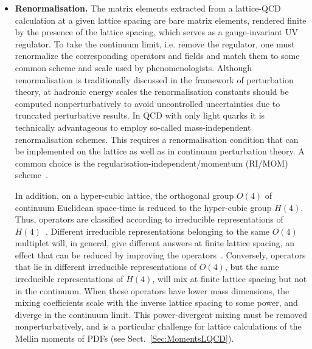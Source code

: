 \begin{itemize}
\item {\bfseries Renormalisation.} The matrix elements extracted from a 
lattice-QCD calculation at a given lattice spacing are bare matrix elements,
rendered finite by the presence of the lattice spacing, which serves
as a gauge-invariant UV regulator. To take the continuum limit,
i.e. remove the regulator, one must renormalize the corresponding
operators and fields and match them to some common scheme and scale used 
by phenomenologists. Although renormalisation is traditionally
discussed in the framework of perturbation theory, at hadronic energy
scales the renormalisation constants should be computed
nonperturbatively to avoid uncontrolled uncertainties due to 
truncated perturbative results.
%
In QCD with only light quarks it is technically
advantageous to employ so-called mass-independent renormalisation
schemes.
%
This requires a renormalisation condition that can be
implemented on the lattice as well as in continuum perturbation
theory. A common choice is the regularisation-independent/momentum (RI/MOM) 
scheme~\cite{Martinelli:1994ty}.

In addition, on a hyper-cubic lattice, the orthogonal group $O(4)$ of
continuum Euclidean space-time is reduced to the hyper-cubic group
$H(4)$.
%
Thus, operators are classified according to irreducible
representations of $H(4)$~\cite{Gockeler:1996mu}.
%
Different
irreducible representations belonging to the same $O(4)$ multiplet
will, in general, give different answers at finite lattice spacing, an
effect that can be reduced by improving the
operators~\cite{Gockeler:2004wp}.
%
Conversely, operators that lie in
different irreducible representations of $O(4)$, but the same irreducible
representations of $H(4)$, will mix at finite lattice spacing but not
in the continuum. When these operators have lower mass dimensions,
the mixing coefficients scale with the inverse lattice spacing to some
power, and diverge in the continuum limit.
%
This power-divergent mixing
must be removed nonperturbatively, and is a particular challenge for
lattice calculations of the Mellin moments of PDFs (see
Sect.~\ref{Sec:MomentsLQCD}).



\end{itemize}
